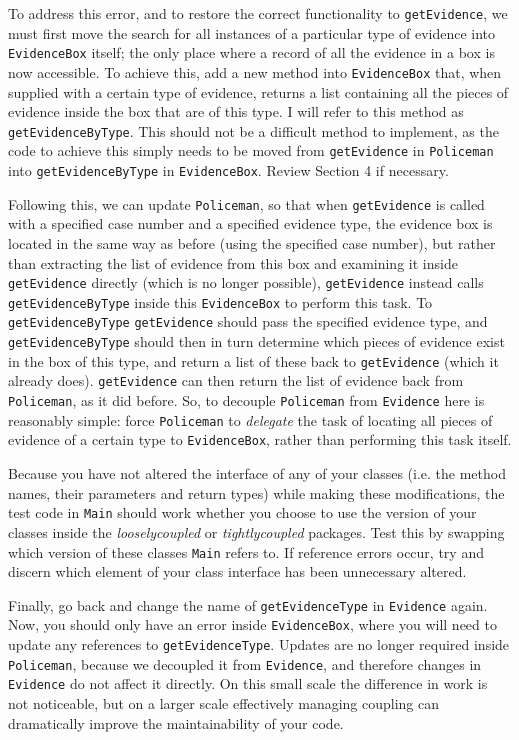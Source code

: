 \documentclass[11pt]{article}
\begin{document}
To address this error, and to restore the correct functionality to \texttt{getEvidence}, we must first move the search for all instances of a particular type of evidence into \texttt{EvidenceBox} itself; the only place where a record of all the evidence in a box is now accessible.  To achieve this, add a new method into \texttt{EvidenceBox} that, when supplied with a certain type of evidence, returns a list containing all the pieces of evidence inside the box that are of this type. I will refer to this method as \texttt{getEvidenceByType}. This should not be a difficult method to implement, as the code to achieve this simply needs to be moved from \texttt{getEvidence} in \texttt{Policeman} into \texttt{getEvidenceByType} in \texttt{EvidenceBox}. Review Section 4 if necessary. 

Following this, we can update \texttt{Policeman}, so that when \texttt{getEvidence} is called with a specified case number and a specified evidence type, the evidence box is located in the same way as before (using the specified case number), but rather than extracting the list of evidence from this box and examining it inside \texttt{getEvidence} directly (which is no longer possible), \texttt{getEvidence} instead calls \texttt{getEvidenceByType} inside this \texttt{EvidenceBox} to perform this task. To \texttt{getEvidenceByType} \texttt{getEvidence} should pass the specified evidence type, and \texttt{getEvidenceByType} should then in turn determine which pieces of evidence exist in the box of this type, and return a list of these back to \texttt{getEvidence} (which it already does). \texttt{getEvidence} can then return the list of evidence back from \texttt{Policeman}, as it did before. So, to decouple \texttt{Policeman} from \texttt{Evidence} here is reasonably simple: force \texttt{Policeman} to \emph{delegate} the task of locating all pieces of evidence of a certain type to \texttt{EvidenceBox}, rather than performing this task itself.

Because you have not altered the interface of any of your classes (i.e. the method names, their parameters and return types) while making these modifications, the test code in \texttt{Main} should work whether you choose to use the version of your classes inside the \emph{looselycoupled} or \emph{tightlycoupled} packages. Test this by swapping which version of these classes \texttt{Main} refers to. If reference errors occur, try and discern which element of your class interface has been unnecessary altered.

Finally, go back and change the name of \texttt{getEvidenceType} in \texttt{Evidence} again. Now, you should only have an error inside \texttt{EvidenceBox}, where you will need to update any references to \texttt{getEvidenceType}. Updates are no longer required inside \texttt{Policeman}, because we decoupled it from \texttt{Evidence}, and therefore changes in \texttt{Evidence} do not affect it directly. On this small scale the difference in work is not noticeable, but on a larger scale effectively managing coupling can dramatically improve the maintainability of your code.
\end{document}
